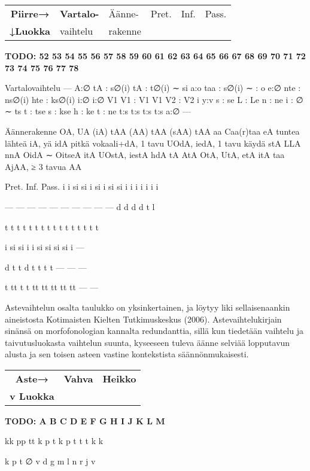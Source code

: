 \documentclass[free]{flammie}
\begin{document}
\begin{table}
    \label{Verbiluokkien äänne- ja muotorakenne sekä
    muut erottavat piirteet}
    \begin{tabular}{|c||l|l|l|l|l|}
        \hline
        \bf Piirre→ &
        \bf Vartalo- & Äänne- & Pret. & Inf. & Pass. \\
        \bf ↓Luokka &
        vaihtelu & rakenne & & & \\
        \hline
    \end{tabular}
    \bf TODO:
52
53
54
55
56
57
58
59
60
61
62
63
64
65
66
67
68
69
70
71
72
73
74
75
76
77
78

Vartalovaihtelu
—
A:∅
tA : s∅(i)
tA : t∅(i) ∼ si
a:o
taa : s∅(i) ∼ : o
e:∅
nte : ns∅(i)
hte : ks∅(i)
i:∅
i:∅
V1 V1 : V1
V1 V2 : V2 i
y:v
s : se
L : Le
n : ne
i : ∅ ∼ ts
t : tse
s : kse
h : ke
t : ne
t:s
t:s
t:s
t:s
a:∅
—

Äännerakenne
OA, UA (iA)
tAA (AA)
tAA (sAA)
tAA
aa
Caa(r)taa
eA
tuntea
lähteä
iA, yä
idA
pitkä vokaali+dA, 1 tavu
UOdA, iedA, 1 tavu
käydä
stA
LLA
nnA
OidA ∼ OitseA
itA
UOstA, iestA
hdA
tA
AtA
OtA, UtA, etA
itA
taa
AjAA, ≥ 3 tavua
AA

Pret. Inf. Pass.
i
i
si
si
i
si
i
si
si
i
i
i
i
i
i
i

—
—
—
—
—
—
—
—
—
—
d
d
d
d
t
l

t
t
t
t
t
t
t
t
t
t
t
t
t
t
t
t

i
si
si
i
i
si
si
si
si
i
—

d
t
t
d
t
t
t
t
—
—
—

t
tt
t
t
tt
tt
tt
tt
tt
—
—
\end{table}

Astevaihtelun osalta taulukko on yksinkertainen, ja löytyy liki sellaisenaankin
aineistosta Kotimaisten Kielten Tutkimuskeskus (2006). Astevaihtelukirjain
sinänsä on morfofonologian kannalta redundanttia, sillä kun tiedetään vaihtelu
ja taivutusluokasta vaihtelun suunta, kyseeseen tuleva äänne selviää lopputavun
alusta ja sen toisen asteen vastine kontekstista säännönmukaisesti.

\begin{table}
    \label{Astevaihteluluokkien vaihteluparit}
    \begin{tabular}{|c||l|l|}
        \hline
        \bf Aste→ & \bf Vahva & \bf Heikko \\
        \bf v Luokka & & \\
        \hline
    \end{tabular}
    \bf TODO:
A
B
C
D
E
F
G
H
I
J
K
L
M

kk
pp
tt
k
p
t
k
p
t
t
t
k
k

k
p
t
∅
v
d
g
m
l
n
r
j
v
\end{table}
\end{document}
